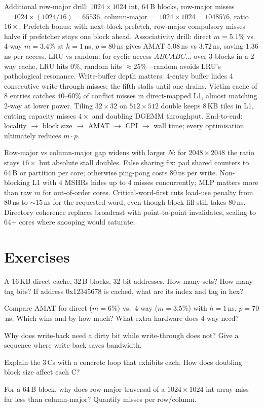 Additional row-major drill: $1024\times1024$ int, 64\,B blocks, row-major misses $=1024\times(1024/16)=65536$, column-major $=1024\times1024=1048576$, ratio $16\times$.
Prefetch bonus: with next-block prefetch, row-major compulsory misses halve if prefetcher stays one block ahead.
Associativity drill: direct $m=5.1\%$ vs 4-way $m=3.4\%$ at $h=1$\,ns, $p=80$\,ns gives AMAT $5.08$\,ns vs $3.72$\,ns, saving $1.36$\,ns per access.
LRU vs random: for cyclic access $ABCABC\ldots$ over 3 blocks in a 2-way cache, LRU hits $0\%$, random hits $\approx 25\%$---random avoids LRU's pathological resonance.
Write-buffer depth matters: 4-entry buffer hides 4 consecutive write-through misses; the fifth stalls until one drains.
Victim cache of 8 entries catches $40$--$60\%$ of conflict misses in direct-mapped L1, almost matching 2-way at lower power.
Tiling $32\times32$ on $512\times512$ double keeps 8\,KB tiles in L1, cutting capacity misses $4\times$ and doubling DGEMM throughput.
End-to-end: locality $\to$ block size $\to$ AMAT $\to$ CPI $\to$ wall time; every optimisation ultimately reduces $m\cdot p$.

Row-major vs column-major gap widens with larger $N$: for $2048\times2048$ the ratio stays $16\times$ but absolute stall doubles.
False sharing fix: pad shared counters to 64\,B or partition per core; otherwise ping-pong costs 80\,ns per write.
Non-blocking L1 with 4 MSHRs hides up to 4 misses concurrently; MLP matters more than raw $m$ for out-of-order cores.
Critical-word-first cuts load-use penalty from $80$\,ns to $\sim 15$\,ns for the requested word, even though block fill still takes 80\,ns.
Directory coherence replaces broadcast with point-to-point invalidates, scaling to 64+ cores where snooping would saturate.

\section{Exercises}
\begin{exercise}A 16\,KB direct cache, 32\,B blocks, 32-bit addresses. How many sets? How many tag bits? If address 0x12345678 is cached, what are its index and tag in hex?\end{exercise}
\begin{exercise}Compare AMAT for direct ($m=6\%$) vs.\ 4-way ($m=3.5\%$) with $h=1$\,ns, $p=70$\,ns. Which wins and by how much? What extra hardware does 4-way need?\end{exercise}
\begin{exercise}Why does write-back need a dirty bit while write-through does not? Give a sequence where write-back saves bandwidth.\end{exercise}
\begin{exercise}Explain the 3\,Cs with a concrete loop that exhibits each. How does doubling block size affect each C?\end{exercise}
\begin{exercise}For a 64\,B block, why does row-major traversal of a $1024\times1024$ int array miss far less than column-major? Quantify misses per row/column.\end{exercise}
